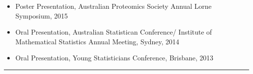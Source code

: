 \documentclass[a4paper,12pt]{report}
\begin{document}
\begin{itemize}
	\item Poster Presentation, Australian Proteomics Society Annual Lorne Symposium, 2015
	\item Oral Presentation, Australian Statistican Conference/ Institute of Mathematical Statistics Annual Meeting, Sydney, 2014
	\item Oral Presentation, Young Statisticians Conference, Brisbane, 2013
\end{itemize}


\hrule


%
%
%


%

\end{document}
